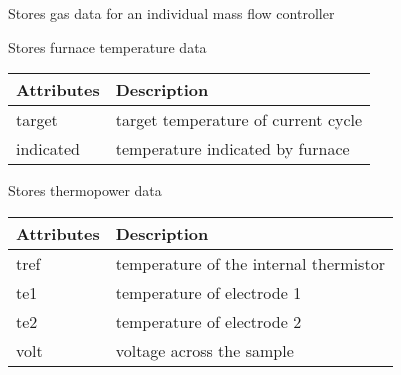 \documentclass[letterpaper,10pt,english]{sphinxmanual}
\begin{document}
\begin{fulllineitems}
\label{\detokenize{data:data.MFC_data}}
Stores gas data for an individual mass flow controller

\end{fulllineitems}


\begin{fulllineitems}
\label{\detokenize{data:data.Temp}}
Stores furnace temperature data


\begin{savenotes}\sphinxattablestart
\centering
\begin{tabulary}{\linewidth}[t]{|T|T|}
\hline
\sphinxstyletheadfamily 
Attributes
&\sphinxstyletheadfamily 
Description
\\
\hline
target
&
target temperature of current cycle
\\
\hline
indicated
&
temperature indicated by furnace
\\
\hline
\end{tabulary}
\par
\sphinxattableend\end{savenotes}

\end{fulllineitems}


\begin{fulllineitems}
\label{\detokenize{data:data.Thermo}}
Stores thermopower data


\begin{savenotes}\sphinxattablestart
\centering
\begin{tabulary}{\linewidth}[t]{|T|T|}
\hline
\sphinxstyletheadfamily 
Attributes
&\sphinxstyletheadfamily 
Description
\\
\hline
tref
&
temperature of the internal thermistor
\\
\hline
te1
&
temperature of electrode 1
\\
\hline
te2
&
temperature of electrode 2
\\
\hline
volt
&
voltage across the sample
\\
\hline
\end{tabulary}
\par
\sphinxattableend\end{savenotes}

\end{fulllineitems}
\end{document}
